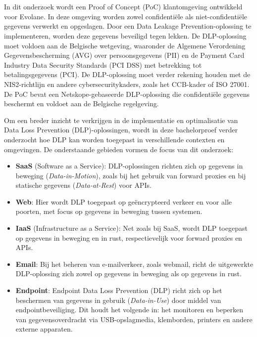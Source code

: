 \section{}%
\label{sec:onderzoeksdoelstelling}

In dit onderzoek wordt een Proof of Concept (PoC) klantomgeving ontwikkeld voor Evolane. 
In deze omgeving worden zowel confidentiële als niet-confidentiële gegevens verwerkt en opgeslagen. 
Door een Data Leakage Prevention-oplossing te implementeren, worden deze gegevens beveiligd tegen lekken. De DLP-oplossing moet voldoen aan de Belgische wetgeving, 
waaronder de Algemene Verordening Gegevensbescherming (AVG) over persoonsgegevens (PII) en de Payment Card Industry Data Security Standards (PCI DSS) met betrekking tot betalingsgegevens (PCI). 
De DLP-oplossing moet verder rekening houden met de NIS2-richtlijn en andere cybersecuritykaders, zoals het CCB-kader of ISO 27001. 
De PoC bevat een Netskope-gebaseerde DLP-oplossing die confidentiële gegevens beschermt en voldoet aan de Belgische regelgeving. 

Om een breder inzicht te verkrijgen in de implementatie en optimalisatie van Data Loss Prevention (DLP)-oplossingen, wordt in deze bachelorproef verder onderzocht hoe DLP kan worden toegepast in verschillende contexten en omgevingen. De onderstaande gebieden vormen de focus van dit onderzoek:

\begin{itemize}
\item \textbf{SaaS} (Software as a Service): DLP-oplossingen richten zich op gegevens in beweging (\textit{Data-in-Motion}), zoals bij het gebruik van forward proxies en bij statische gegevens (\textit{Data-at-Rest}) voor APIs.
\item \textbf{Web}: Hier wordt DLP toegepast op geëncrypteerd verkeer en voor alle poorten, met focus op gegevens in beweging tussen systemen.
\item \textbf{IaaS} (Infrastructure as a Service): Net zoals bij SaaS, wordt DLP toegepast op gegevens in beweging en in rust, respectievelijk voor forward proxies en APIs.
\item \textbf{Email}: Bij het beheren van e-mailverkeer, zoals webmail, richt de uitgewerkte DLP-oplossing zich zowel op gegevens in beweging als op gegevens in rust.
\item \textbf{Endpoint}: Endpoint Data Loss Prevention (DLP) richt zich op het beschermen van gegevens in gebruik (\textit{Data-in-Use}) door middel van endpointbeveiliging. Dit houdt het volgende in: het monitoren en beperken van gegevensoverdracht via USB-opslagmedia, klemborden, printers en andere externe apparaten.
\end{itemize}




